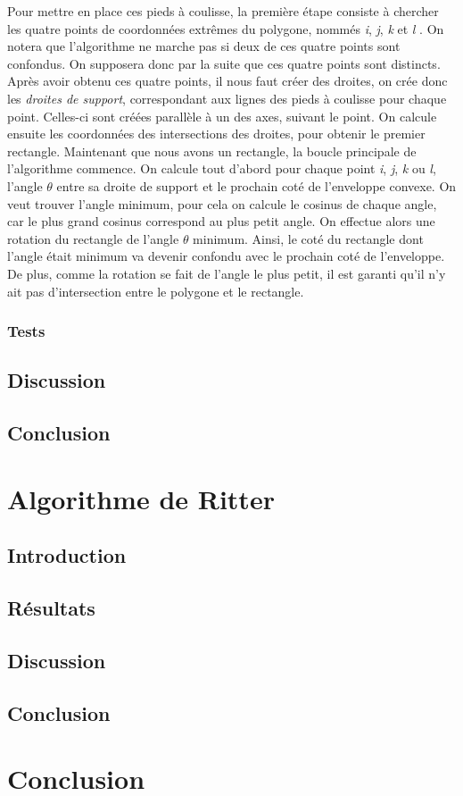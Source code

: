 \documentclass[12pt]{report}
\begin{document}
Pour mettre en place ces pieds à coulisse, la première étape consiste à chercher les quatre points de coordonnées extrêmes du polygone, nommés \emph{i}, \emph{j}, \emph{k} et \emph{l} . On notera que l'algorithme ne marche pas si deux de ces quatre points sont confondus. On supposera donc par la suite que ces quatre points sont distincts. Après avoir obtenu ces quatre points, il nous faut créer des droites, on crée donc les \emph{droites de support}, correspondant aux lignes des pieds à coulisse pour chaque point. Celles-ci sont créées parallèle à un des axes, suivant le point. On calcule ensuite les coordonnées des intersections des droites, pour obtenir le premier rectangle. Maintenant que nous avons un rectangle, la boucle principale de l'algorithme commence. On calcule tout d'abord pour chaque point \emph{i}, \emph{j}, \emph{k} ou \emph{l}, l'angle $\theta$ entre sa droite de support et le prochain coté de l'enveloppe convexe. On veut trouver l'angle minimum, pour cela on calcule le cosinus de chaque angle, car le plus grand cosinus correspond au plus petit angle. On effectue alors une rotation du rectangle de l'angle $\theta$ minimum. Ainsi, le coté du rectangle dont l'angle était minimum va devenir confondu avec le prochain coté de l'enveloppe. De plus, comme la rotation se fait de l'angle le plus petit, il est garanti qu'il n'y ait pas d'intersection entre le polygone et le rectangle.

\subsection{Tests}
\section{Discussion}
\section{Conclusion}
\chapter{Algorithme de Ritter}
\section{Introduction}
\section{Résultats}
\section{Discussion}
\section{Conclusion}
\chapter{Conclusion}
\end{document}
